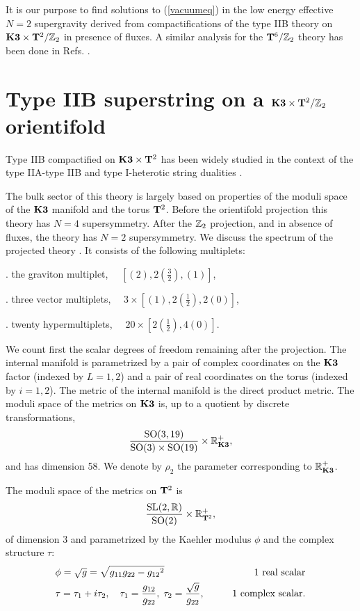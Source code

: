 \documentclass[a4paper,12pt]{article}
\begin{document}
It is our purpose to find solutions to (\ref{vacuumeq}) in the low
energy effective $N=2$ supergravity derived from compactifications
of the type IIB theory on $\mathbf{K3}\times \mathbf{T}^2/\mathbb{Z}_2$ in presence of
fluxes. A similar analysis for the $\mathbf{T}^6/\mathbb{Z}_2$ theory has been
done in Refs. \cite{dfv,dflv,adflq}.

\section{Type IIB superstring on a $\mathbf{K3}\times \mathbf{T}^2/\mathbb{Z}_2$ orientifold}

Type IIB compactified on $\mathbf{K3}\times \mathbf{T}^2$ has been widely studied
in the context of the  type IIA-type IIB and type I-heterotic
string dualities \cite{ya,fhsv,klm,dlr,as}.




 The bulk sector of this theory is largely based on
properties of the moduli space  \cite{se,cfg} of the $\mathbf{K3}$ manifold
\cite{as} and the torus $\mathbf{T}^2$. Before the orientifold projection
this theory has $N=4$ supersymmetry. After the $\mathbb{Z}_2$ projection,
and in absence of fluxes, the theory has $N=2$ supersymmetry. We
discuss the spectrum of the projected theory \cite{tt}. It
consists of the following multiplets:
\smallskip

. the graviton multiplet, $\quad[ (2), 2(\frac 3 2),
(1)]$,

\smallskip

. three vector multiplets, $\quad 3\times [ (1),
2(\frac 1 2), 2(0)]$,

\smallskip

. twenty hypermultiplets, $\quad 20\times [2(\frac 1
2), 4(0)]$.

\bigskip

We count first the scalar degrees of freedom remaining after the
projection. The internal manifold is parametrized by a pair of
complex coordinates on the $\mathbf{K3}$ factor (indexed by $L=1,2$) and a
pair of real coordinates on the torus (indexed by $i=1,2$).  The
metric of the internal manifold is the direct product metric.  The
moduli space of the metrics on $\mathbf{K3}$ is, up to a quotient by
discrete transformations,
\begin{equation}\frac{\mathrm{SO}(3,19)}{\mathrm{SO}(3)\times
\mathrm{SO}(19)}\times \mathbb{R}^+_{\mathbf{K3}},\label{k3metrics}\end{equation} and has
dimension 58. We denote by $\rho_2$ the parameter corresponding to
$\mathbb{R}^+_{\mathbf{K3}}$.

 The moduli space of the metrics on $\mathbf{T}^2$ is
$$\frac{\mathrm{SL}(2,\mathbb{R})}{\mathrm{SO}(2)}\times \mathbb{R}^+_{\mathbf{T}^2},$$
of dimension 3 and parametrized by the Kaehler modulus $\phi$ and
the complex structure $\tau$:
\begin{eqnarray}
&\phi=\sqrt{g}=\sqrt{g_{11}g_{22}-{g_{12}}^2}\qquad &\hbox{1 real scalar}\label{kmodulus}\\
&\tau=\tau_1+ i\tau_2, \quad \tau_1=\frac {g_{12}} {g_{22}}, \;
\tau_2=\frac {\sqrt{g}} {g_{22}},\qquad &\hbox{1 complex
scalar}.\end{eqnarray}
\end{document}
